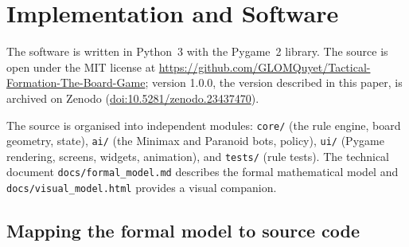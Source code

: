 \section{Implementation and Software}
\label{sec:impl}

The software is written in Python~3 with the Pygame~2 library. The source is
open under the MIT license at
\url{https://github.com/GLOMQuyet/Tactical-Formation-The-Board-Game};
version 1.0.0, the version described in this paper, is archived on Zenodo
(\href{https://doi.org/10.5281/zenodo.23437470}{doi:10.5281/zenodo.23437470}).

The source is organised into independent modules: \texttt{core/} (the rule
engine, board geometry, state), \texttt{ai/} (the Minimax and Paranoid
bots, policy), \texttt{ui/} (Pygame rendering, screens, widgets,
animation), and \texttt{tests/} (rule tests). The technical document
\texttt{docs/formal\_model.md} describes the formal mathematical model and
\texttt{docs/visual\_model.html} provides a visual companion.

\subsection{Mapping the formal model to source code}
\label{ssec:mapping}

